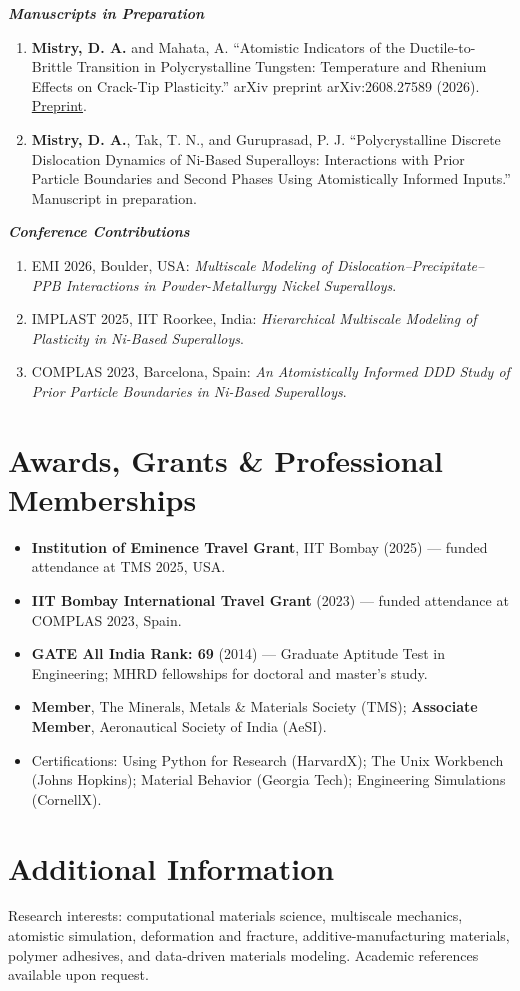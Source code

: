 \documentclass[10pt,a4paper]{article}
\begin{document}
\textbf{\textit{Manuscripts in Preparation}}
\begin{enumerate}[leftmargin=1.35em,itemsep=2pt,topsep=1pt]
  \item \textbf{Mistry, D. A.} and Mahata, A. ``Atomistic Indicators of the Ductile-to-Brittle Transition in Polycrystalline Tungsten: Temperature and Rhenium Effects on Crack-Tip Plasticity.'' arXiv preprint arXiv:2608.27589 (2026). \href{https://arxiv.org/abs/2608.27589}{Preprint}.
  \item \textbf{Mistry, D. A.}, Tak, T. N., and Guruprasad, P. J. ``Polycrystalline Discrete Dislocation Dynamics of Ni-Based Superalloys: Interactions with Prior Particle Boundaries and Second Phases Using Atomistically Informed Inputs.'' Manuscript in preparation.
\end{enumerate}

\textbf{\textit{Conference Contributions}}
\begin{enumerate}[leftmargin=1.35em,itemsep=2pt,topsep=1pt]
  \item EMI 2026, Boulder, USA: \textit{Multiscale Modeling of Dislocation--Precipitate--PPB Interactions in Powder-Metallurgy Nickel Superalloys}.
  \item IMPLAST 2025, IIT Roorkee, India: \textit{Hierarchical Multiscale Modeling of Plasticity in Ni-Based Superalloys}.
  \item COMPLAS 2023, Barcelona, Spain: \textit{An Atomistically Informed DDD Study of Prior Particle Boundaries in Ni-Based Superalloys}.
\end{enumerate}


\section{Awards, Grants \& Professional Memberships}
\begin{itemize}
  \item \textbf{Institution of Eminence Travel Grant}, IIT Bombay (2025) --- funded attendance at TMS 2025, USA.
  \item \textbf{IIT Bombay International Travel Grant} (2023) --- funded attendance at COMPLAS 2023, Spain.
  \item \textbf{GATE All India Rank: 69} (2014) --- Graduate Aptitude Test in Engineering; MHRD fellowships for doctoral and master's study.
  \item \textbf{Member}, The Minerals, Metals \& Materials Society (TMS); \textbf{Associate Member}, Aeronautical Society of India (AeSI).
  \item Certifications: Using Python for Research (HarvardX); The Unix Workbench (Johns Hopkins); Material Behavior (Georgia Tech); Engineering Simulations (CornellX).
\end{itemize}

\section{Additional Information}
Research interests: computational materials science, multiscale mechanics, atomistic simulation, deformation and fracture, additive-manufacturing materials, polymer adhesives, and data-driven materials modeling. Academic references available upon request.
\end{document}
